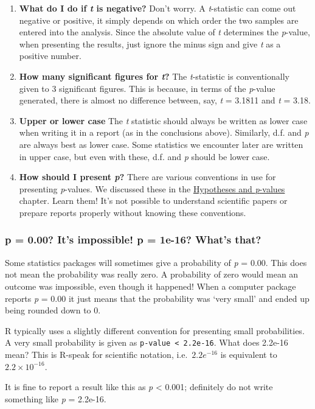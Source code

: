 \documentclass[
]{book}
\newenvironment{greybox}{
  \definecolor{shadecolor}{rgb}{0.95,0.95,0.95}  %
  \color{black}
  \begin{shaded}}
 {\end{shaded}}
\newenvironment{infobox}[1]
  {
  \begin{itemize}
  \renewcommand{\labelitemi}{
    \raisebox{-.7\height}[0pt][0pt]{
      {\setkeys{Gin}{width=3em,keepaspectratio}
        \texttt{[image: images/\#1]}}
    }
  }
  \setlength{\fboxsep}{1em}
  \begin{greybox}
  \item
  }
  {
  \end{greybox}
  \end{itemize}
  }
\begin{document}
\begin{enumerate}
\def\labelenumi{\arabic{enumi}.}
\item
  \textbf{What do I do if \emph{t} is negative?} Don't worry. A \emph{t}-statistic can come out negative or positive, it simply depends on which order the two samples are entered into the analysis. Since the absolute value of \emph{t} determines the \emph{p}-value, when presenting the results, just ignore the minus sign and give \emph{t} as a positive number.
\item
  \textbf{How many significant figures for \emph{t}?} The \emph{t}-statistic is conventionally given to 3 significant figures. This is because, in terms of the \emph{p}-value generated, there is almost no difference between, say, \emph{t} = 3.1811 and \emph{t} = 3.18.
\item
  \textbf{Upper or lower case} The \emph{t} statistic should always be written as lower case when writing it in a report (as in the conclusions above). Similarly, d.f. and \emph{p} are always best as lower case. Some statistics we encounter later are written in upper case, but even with these, d.f. and \emph{p} should be lower case.
\item
  \textbf{How should I present \emph{p}?} There are various conventions in use for presenting \emph{p}-values. We discussed these in the \protect\hyperlink{hypotheses-and-p-values}{Hypotheses and \emph{p}-values} chapter. Learn them! It's not possible to understand scientific papers or prepare reports properly without knowing these conventions.
\end{enumerate}

\begin{infobox}{warning}

\hypertarget{p-0.00-its-impossible-p-1e-16-whats-that}{%
\subsubsection*{p = 0.00? It's impossible! p = 1e-16? What's that?}\label{p-0.00-its-impossible-p-1e-16-whats-that}}

Some statistics packages will sometimes give a probability of \emph{p} = 0.00. This does not mean the probability was really zero. A probability of zero would mean an outcome was impossible, even though it happened! When a computer package reports \emph{p} = 0.00 it just means that the probability was `very small' and ended up being rounded down to 0.

R typically uses a slightly different convention for presenting small probabilities. A very small probability is given as \texttt{p-value\ \textless{}\ 2.2e-16}. What does 2.2e-16 mean? This is R-speak for scientific notation, i.e.~\(2.2e^{-16}\) is equivalent to \(2.2 \times 10^{-16}\).

It is fine to report a result like this as \emph{p} \textless{} 0.001; definitely do not write something like \emph{p} = 2.2e-16.

\end{infobox}
\end{document}

